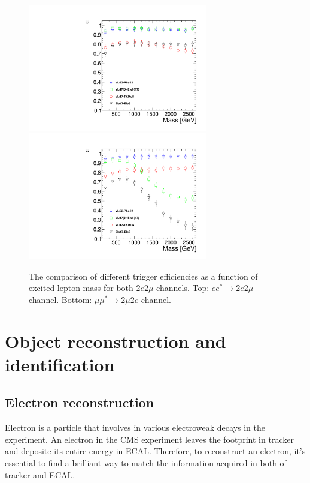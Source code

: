 \begin{figure}[hp!]
\begin{center}
\includegraphics[width=0.7\textwidth]{plot/TrgEff_estar.pdf}
\includegraphics[width=0.7\textwidth]{plot/TrgEff_mustar.pdf} \\
\end{center}
\caption{\label{fig:TrgEff}The comparison of different trigger efficiencies as a function of excited lepton mass for both $2e2\mu$ channels. Top: $ee^{*}\rightarrow2e2\mu$ channel. Bottom: $\mu\mu^{*}\rightarrow2\mu2e$ channel.}
\end{figure}

\section{Object reconstruction and identification}

\subsection{Electron reconstruction}
Electron is a particle that involves in various electroweak decays in the experiment. An electron in the CMS experiment leaves the footprint in tracker and deposite its entire energy in ECAL. Therefore, to reconstruct an electron, it's essential to find a brilliant way to match the information acquired in both of tracker and ECAL.   
